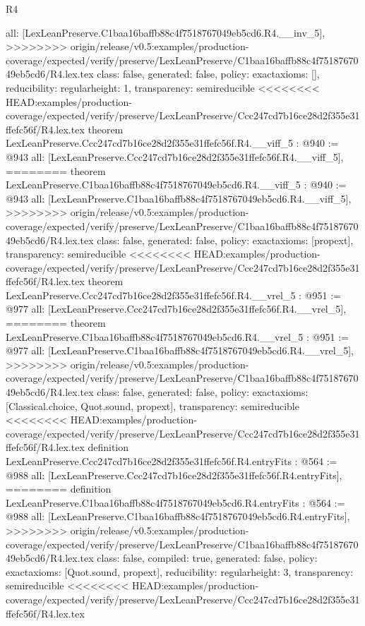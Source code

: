 \begin{lexlean}{R4}
\begin{coremodule}
{{{{{{{{{{{{  all: [LexLeanPreserve.C1baa16baffb88c4f7518767049eb5cd6.R4.__inv_5],
>>>>>>>> origin/release/v0.5:examples/production-coverage/expected/verify/preserve/LexLeanPreserve/C1baa16baffb88c4f7518767049eb5cd6/R4.lex.tex
  class: false,
  generated: false,
  policy: exact{axioms: []},
  reducibility: regular{height: 1},
  transparency: semireducible
}
<<<<<<<< HEAD:examples/production-coverage/expected/verify/preserve/LexLeanPreserve/Ccc247cd7b16ce28d2f355e31ffefc56f/R4.lex.tex
theorem LexLeanPreserve.Ccc247cd7b16ce28d2f355e31ffefc56f.R4.__viff_5 : @940 := @943 {
  all: [LexLeanPreserve.Ccc247cd7b16ce28d2f355e31ffefc56f.R4.__viff_5],
========
theorem LexLeanPreserve.C1baa16baffb88c4f7518767049eb5cd6.R4.__viff_5 : @940 := @943 {
  all: [LexLeanPreserve.C1baa16baffb88c4f7518767049eb5cd6.R4.__viff_5],
>>>>>>>> origin/release/v0.5:examples/production-coverage/expected/verify/preserve/LexLeanPreserve/C1baa16baffb88c4f7518767049eb5cd6/R4.lex.tex
  class: false,
  generated: false,
  policy: exact{axioms: [propext]},
  transparency: semireducible
}
<<<<<<<< HEAD:examples/production-coverage/expected/verify/preserve/LexLeanPreserve/Ccc247cd7b16ce28d2f355e31ffefc56f/R4.lex.tex
theorem LexLeanPreserve.Ccc247cd7b16ce28d2f355e31ffefc56f.R4.__vrel_5 : @951 := @977 {
  all: [LexLeanPreserve.Ccc247cd7b16ce28d2f355e31ffefc56f.R4.__vrel_5],
========
theorem LexLeanPreserve.C1baa16baffb88c4f7518767049eb5cd6.R4.__vrel_5 : @951 := @977 {
  all: [LexLeanPreserve.C1baa16baffb88c4f7518767049eb5cd6.R4.__vrel_5],
>>>>>>>> origin/release/v0.5:examples/production-coverage/expected/verify/preserve/LexLeanPreserve/C1baa16baffb88c4f7518767049eb5cd6/R4.lex.tex
  class: false,
  generated: false,
  policy: exact{axioms: [Classical.choice, Quot.sound, propext]},
  transparency: semireducible
}
<<<<<<<< HEAD:examples/production-coverage/expected/verify/preserve/LexLeanPreserve/Ccc247cd7b16ce28d2f355e31ffefc56f/R4.lex.tex
definition LexLeanPreserve.Ccc247cd7b16ce28d2f355e31ffefc56f.R4.entryFits : @564 := @988 {
  all: [LexLeanPreserve.Ccc247cd7b16ce28d2f355e31ffefc56f.R4.entryFits],
========
definition LexLeanPreserve.C1baa16baffb88c4f7518767049eb5cd6.R4.entryFits : @564 := @988 {
  all: [LexLeanPreserve.C1baa16baffb88c4f7518767049eb5cd6.R4.entryFits],
>>>>>>>> origin/release/v0.5:examples/production-coverage/expected/verify/preserve/LexLeanPreserve/C1baa16baffb88c4f7518767049eb5cd6/R4.lex.tex
  class: false,
  compiled: true,
  generated: false,
  policy: exact{axioms: [Quot.sound, propext]},
  reducibility: regular{height: 3},
  transparency: semireducible
}
<<<<<<<< HEAD:examples/production-coverage/expected/verify/preserve/LexLeanPreserve/Ccc247cd7b16ce28d2f355e31ffefc56f/R4.lex.tex
}}}}}}}}}}}}}}
\end{coremodule}
\end{lexlean}
